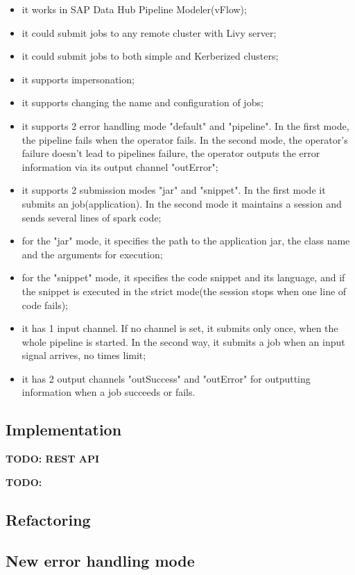 \documentclass[article,colorback,accentcolor=tud4c]{tudreport}
\begin{document}
	\begin{itemize}
		\item it works in SAP Data Hub Pipeline Modeler(vFlow);
		\item it could submit jobs to any remote cluster with Livy server;
		\item it could submit jobs to both simple and Kerberized clusters;
		\item it supports impersonation;
		\item it supports changing the name and configuration of jobs;
		\item it supports 2 error handling mode "default" and "pipeline". In the first mode, the pipeline fails when the operator fails. In the second mode, the operator's failure doesn't lead to pipelines failure, the operator outputs the error information via its output channel "outError";
		\item it supports 2 submission modes "jar" and "snippet". In the first mode it submits an job(application). In the second mode it maintains a session and sends several lines of spark code;
		\item for the "jar" mode, it specifies the path to the application jar, the class name and the arguments for execution;
		\item for the "snippet" mode, it specifies the code snippet and its language, and if the snippet is executed in the strict mode(the session stops when one line of code fails);
		\item it has 1 input channel. If no channel is set, it submits only once, when the whole pipeline is started. In the second way, it submits a job when an input signal arrives, no times limit;
		\item it has 2 output channels "outSuccess" and "outError" for outputting information when a job succeeds or fails.
	\end{itemize}
	
	\subsection{Implementation}
	\textbf{TODO: REST API}
	
	\textbf{TODO: }
	
	
	\subsection{Refactoring}
	
	\subsection{New error handling mode}
\end{document}
